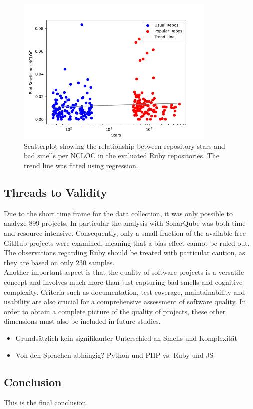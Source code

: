\documentclass[a4paper, 12pt]{article}
\begin{document}
\begin{figure}[h!]
  \centering
  \includegraphics[width=0.85\textwidth]{./media/ruby-smells-scatterplot.png}
  \caption{Scatterplot showing the relationship between repository stars and bad smells per NCLOC in the evaluated Ruby repositories. The trend line was fitted using regression.}
  \label{fig:scatter-smells-ruby}
\end{figure}

\subsection*{Threads to Validity}

Due to the short time frame for the data collection, it was only possible to analyze 899 projects. In particular the analysis with SonarQube was both time- and resource-intensive. Consequently, only a small fraction of the available free GitHub projects were examined, meaning that a bias effect cannot be ruled out. The observations regarding Ruby should be treated with particular caution, as they are based on only 230 samples.\\

Another important aspect is that the quality of software projects is a versatile concept and involves much more than just capturing bad smells and cognitive complexity. Criteria such as documentation, test coverage, maintainability and usability are also crucial for a comprehensive assessment of software quality. In order to obtain a complete picture of the quality of projects, these other dimensions must also be included in future studies.\\

\begin{itemize}
\item Grundsätzlich kein signifikanter Unterschied an Smells und Komplexität
\item Von den Sprachen abhängig? Python und PHP vs. Ruby und JS
\end{itemize}	
	
\subsection*{Conclusion}
This is the final conclusion.
	
\end{document}
